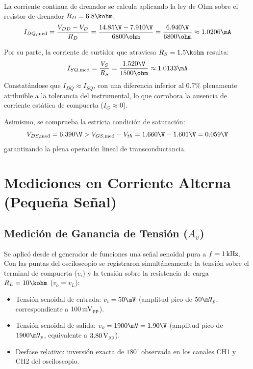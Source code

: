 La corriente continua de drenador se calcula aplicando la ley de Ohm sobre el resistor de drenador $R_D = 6.8\kohm$:
\begin{equation}
  I_{DQ,\mathrm{med}} = \frac{V_{DD} - V_D}{R_D} = \frac{14.85\V - 7.910\V}{6800\ohm} = \frac{6.940\V}{6800\ohm} \approx 1.0206\mA
  \label{eq:ID_medida}
\end{equation}

Por su parte, la corriente de surtidor que atraviesa $R_S = 1.5\kohm$ resulta:
\begin{equation}
  I_{SQ,\mathrm{med}} = \frac{V_S}{R_S} = \frac{1.520\V}{1500\ohm} \approx 1.0133\mA
\end{equation}
Constatándose que $I_{DQ} \approx I_{SQ}$, con una diferencia inferior al $0.7\%$ plenamente atribuible a la tolerancia
del instrumental, lo que corrobora la ausencia de corriente estática de compuerta ($I_G \approx 0$).

Asimismo, se comprueba la estricta condición de saturación:
\begin{equation}
  V_{DS,\mathrm{med}} = 6.390\V > V_{GS,\mathrm{med}} - V_{th} = 1.660\V - 1.601\V = 0.059\V
\end{equation}
garantizando la plena operación lineal de transconductancia.

\section{Mediciones en Corriente Alterna (Pequeña Señal)}

\subsection{Medición de Ganancia de Tensión (\texorpdfstring{$A_v$}{Av})}
Se aplicó desde el generador de funciones una señal senoidal pura a $f = 1\,\mathrm{kHz}$. Con las puntas del osciloscopio se
registraron simultáneamente la tensión sobre el terminal de compuerta ($v_i$) y la tensión sobre la resistencia de
carga $R_L = 10\kohm$ ($v_o = v_L$):
\begin{itemize}
  \item Tensión senoidal de entrada: $v_i = 50\mV$ (amplitud pico de $50\mV_p$, correspondiente a $100\,\mathrm{mV}_{\mathrm{pp}}$).
  \item Tensión senoidal de salida: $v_o = 1900\mV = 1.90\V$ (amplitud pico de $1900\mV_p$, equivalente a $3.80\,\mathrm{V}_{\mathrm{pp}}$).
  \item Desfase relativo: inversión exacta de $180^\circ$ observada en los canales CH1 y CH2 del osciloscopio.
\end{itemize}

